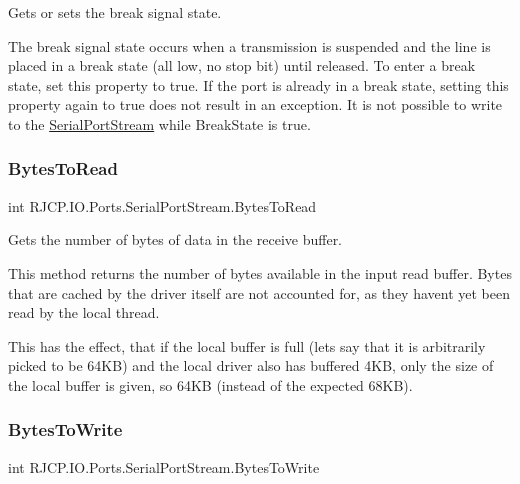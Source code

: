 Gets or sets the break signal state. 

The break signal state occurs when a transmission is suspended and the line is placed in a break state (all low, no stop bit) until released. To enter a break state, set this property to true. If the port is already in a break state, setting this property again to true does not result in an exception. It is not possible to write to the \mbox{\hyperlink{class_r_j_c_p_1_1_i_o_1_1_ports_1_1_serial_port_stream}{Serial\+Port\+Stream}} while Break\+State is true. \mbox{\label{class_r_j_c_p_1_1_i_o_1_1_ports_1_1_serial_port_stream_ab76cab2ea478310b7dc0f1124d5c435c}} 
\subsubsection{\texorpdfstring{BytesToRead}{BytesToRead}}
{\footnotesize\ttfamily int R\+J\+C\+P.\+I\+O.\+Ports.\+Serial\+Port\+Stream.\+Bytes\+To\+Read\hspace{0.3cm}{\ttfamily [get]}}



Gets the number of bytes of data in the receive buffer. 

This method returns the number of bytes available in the input read buffer. Bytes that are cached by the driver itself are not accounted for, as they haven\textquotesingle{}t yet been read by the local thread. 

This has the effect, that if the local buffer is full (let\textquotesingle{}s say that it is arbitrarily picked to be 64KB) and the local driver also has buffered 4KB, only the size of the local buffer is given, so 64KB (instead of the expected 68KB).\mbox{\label{class_r_j_c_p_1_1_i_o_1_1_ports_1_1_serial_port_stream_a46df89a1aaa129905494b3a9e3f9e2c3}} 
\subsubsection{\texorpdfstring{BytesToWrite}{BytesToWrite}}
{\footnotesize\ttfamily int R\+J\+C\+P.\+I\+O.\+Ports.\+Serial\+Port\+Stream.\+Bytes\+To\+Write\hspace{0.3cm}{\ttfamily [get]}}



